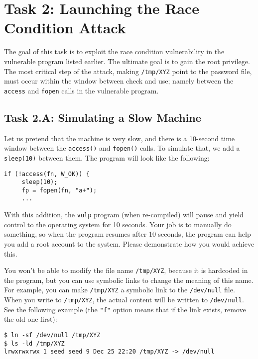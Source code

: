 \section{Task 2: Launching the Race Condition Attack}

The goal of this task is to exploit the race condition vulnerability in 
the vulnerable \setuid program listed earlier. The ultimate goal is to gain
the root privilege.  The most critical step of the attack,  making
\texttt{/tmp/XYZ} point to the password file, must occur within
the window between check and use; namely between the \texttt{access} 
and \texttt{fopen} calls in the vulnerable program. 

\subsection{Task 2.A: Simulating a Slow Machine} 

Let us pretend that the machine is very slow, and there is a 10-second time window between
the \texttt{access()} and \texttt{fopen()} calls. To simulate that, we 
add a \texttt{sleep(10)} between them. The program will look like the following:

\begin{lstlisting}
if (!access(fn, W_OK)) {
     sleep(10);
     fp = fopen(fn, "a+");
     ...
\end{lstlisting}
 
With this addition, the \texttt{vulp} program (when re-compiled)
will pause and yield control to the operating system for 10 seconds.
Your job is to manually do something, so when the program resumes
after 10 seconds, the program can help you
add a root account to the system. Please 
demonstrate how you would achieve this. 

You won't be able to modify the file name \texttt{/tmp/XYZ}, because 
it is hardcoded in the program, but you can use symbolic links to 
change the meaning of this name. For example, you can make 
\texttt{/tmp/XYZ} a symbolic link to the \texttt{/dev/null} file. 
When you write to \texttt{/tmp/XYZ}, the actual content will be written
to \texttt{/dev/null}. See the following example (the \texttt{"f"} option 
means that if the link exists, remove the old one first): 

\begin{lstlisting}
$ ln -sf /dev/null /tmp/XYZ
$ ls -ld /tmp/XYZ
lrwxrwxrwx 1 seed seed 9 Dec 25 22:20 /tmp/XYZ -> /dev/null
\end{lstlisting}
 

